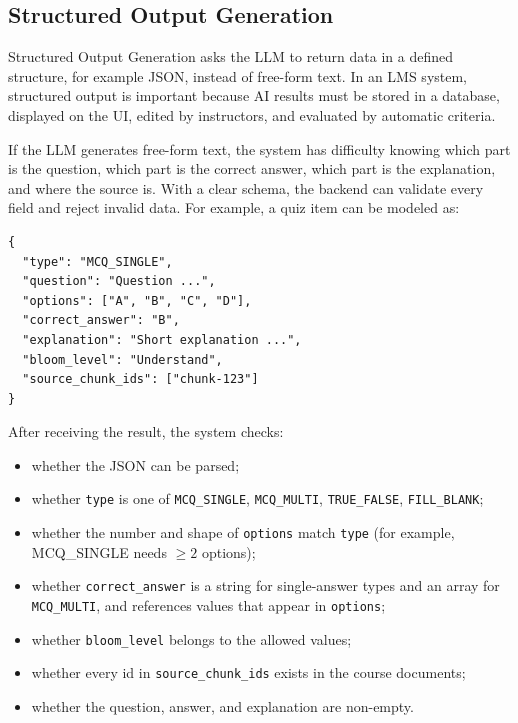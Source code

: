 \subsection{Structured Output Generation}
\label{subsec:structured-output-generation}

Structured Output Generation asks the LLM to return data in a defined
structure, for example JSON, instead of free-form text. In an LMS system,
structured output is important because AI results must be stored in a
database, displayed on the UI, edited by instructors, and evaluated by
automatic criteria.

If the LLM generates free-form text, the system has difficulty knowing
which part is the question, which part is the correct answer, which part
is the explanation, and where the source is. With a clear schema, the
backend can validate every field and reject invalid data. For example, a
quiz item can be modeled as:

\begin{lstlisting}[caption={Example output structure for a quiz item}]
{
  "type": "MCQ_SINGLE",
  "question": "Question ...",
  "options": ["A", "B", "C", "D"],
  "correct_answer": "B",
  "explanation": "Short explanation ...",
  "bloom_level": "Understand",
  "source_chunk_ids": ["chunk-123"]
}
\end{lstlisting}

After receiving the result, the system checks:

\begin{itemize}
    \item whether the JSON can be parsed;
    \item whether \texttt{type} is one of \texttt{MCQ\_SINGLE},
          \texttt{MCQ\_MULTI}, \texttt{TRUE\_FALSE},
          \texttt{FILL\_BLANK};
    \item whether the number and shape of \texttt{options} match
          \texttt{type} (for example, MCQ\_SINGLE needs $\geq 2$
          options);
    \item whether \texttt{correct\_answer} is a string for single-answer
          types and an array for \texttt{MCQ\_MULTI}, and references
          values that appear in \texttt{options};
    \item whether \texttt{bloom\_level} belongs to the allowed values;
    \item whether every id in \texttt{source\_chunk\_ids} exists in the
          course documents;
    \item whether the question, answer, and explanation are non-empty.
\end{itemize}


